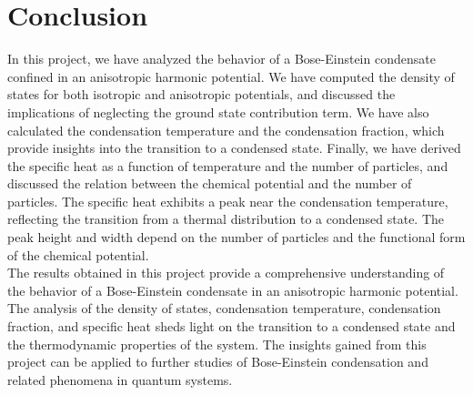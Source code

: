 \documentclass{article}
\numberwithin{equation}{section}
\numberwithin{equation}{subsection}
\begin{document}
\section{Conclusion}
In this project, we have analyzed the behavior of a Bose-Einstein condensate confined in an anisotropic harmonic potential. We have computed the density of states for both isotropic and anisotropic potentials, and discussed the implications of neglecting the ground state contribution term. We have also calculated the condensation temperature and the condensation fraction, which provide insights into the transition to a condensed state. Finally, we have derived the specific heat as a function of temperature and the number of particles, and discussed the relation between the chemical potential and the number of particles. The specific heat exhibits a peak near the condensation temperature, reflecting the transition from a thermal distribution to a condensed state. The peak height and width depend on the number of particles and the functional form of the chemical potential.\\

The results obtained in this project provide a comprehensive understanding of the behavior of a Bose-Einstein condensate in an anisotropic harmonic potential. The analysis of the density of states, condensation temperature, condensation fraction, and specific heat sheds light on the transition to a condensed state and the thermodynamic properties of the system. The insights gained from this project can be applied to further studies of Bose-Einstein condensation and related phenomena in quantum systems.\\
\end{document}
